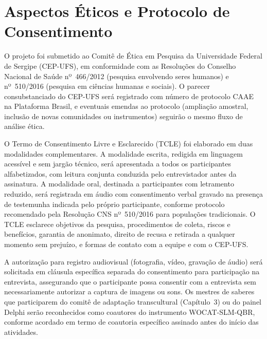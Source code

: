 
\section{Aspectos Éticos e Protocolo de Consentimento}
\label{sec:etica_geral}

O projeto foi submetido ao Comitê de Ética em Pesquisa da Universidade Federal de Sergipe (CEP-UFS), em conformidade com as Resoluções do Conselho Nacional de Saúde nº~466/2012 (pesquisa envolvendo seres humanos) e nº~510/2016 (pesquisa em ciências humanas e sociais). O parecer consubstanciado do CEP-UFS será registrado com número de protocolo CAAE na Plataforma Brasil, e eventuais emendas ao protocolo (ampliação amostral, inclusão de novas comunidades ou instrumentos) seguirão o mesmo fluxo de análise ética.

O Termo de Consentimento Livre e Esclarecido (TCLE) foi elaborado em duas modalidades complementares. A modalidade escrita, redigida em linguagem acessível e sem jargão técnico, será apresentada a todos os participantes alfabetizados, com leitura conjunta conduzida pelo entrevistador antes da assinatura. A modalidade oral, destinada a participantes com letramento reduzido, será registrada em áudio com consentimento verbal gravado na presença de testemunha indicada pelo próprio participante, conforme protocolo recomendado pela Resolução CNS nº~510/2016 para populações tradicionais. O TCLE esclarece objetivos da pesquisa, procedimentos de coleta, riscos e benefícios, garantia de anonimato, direito de recusa e retirada a qualquer momento sem prejuízo, e formas de contato com a equipe e com o CEP-UFS.

A autorização para registro audiovisual (fotografia, vídeo, gravação de áudio) será solicitada em cláusula específica separada do consentimento para participação na entrevista, assegurando que o participante possa consentir com a entrevista sem necessariamente autorizar a captura de imagens ou sons. Os mestres de saberes que participarem do comitê de adaptação transcultural (Capítulo~3) ou do painel Delphi serão reconhecidos como coautores do instrumento WOCAT-SLM-QBR, conforme acordado em termo de coautoria específico assinado antes do início das atividades.

